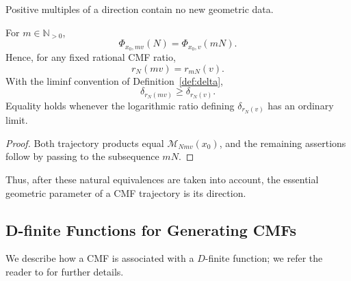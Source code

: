 \documentclass[oneside,english,11pt]{amsart}
\begin{document}
Positive multiples of a direction contain no new geometric data.

\begin{cor}
\label{cor:angular-search}
For $m\in\mathbb N_{>0}$,
\[
    \Phi_{x_0,mv}(N)=\Phi_{x_0,v}(mN).
\]
Hence, for any fixed rational CMF ratio,
\[
    r_N(mv)=r_{mN}(v).
\]
With the liminf convention of Definition~\ref{def:delta},
\[
    \delta_{r_N(mv)}
    \ge
    \delta_{r_N(v)}.
\]
Equality holds whenever the logarithmic ratio defining
$\delta_{r_N(v)}$ has an ordinary limit.
\end{cor}

\begin{proof}
Both trajectory products equal $\mathcal M_{Nmv}(x_0)$, and the
remaining assertions follow by passing to the subsequence $mN$.
\end{proof}

Thus, after these natural equivalences are taken into account, the
essential geometric parameter of a CMF trajectory is its direction.





\subsection{D-finite Functions for Generating CMFs}
\label{subsec:dfinite-cmf-construction}
\label{subsec:holonomic-cmf}


We describe how a CMF is associated with a $D$-finite function; we refer the reader to \cite{weinbaum2025conservative} for further details.
\end{document}
